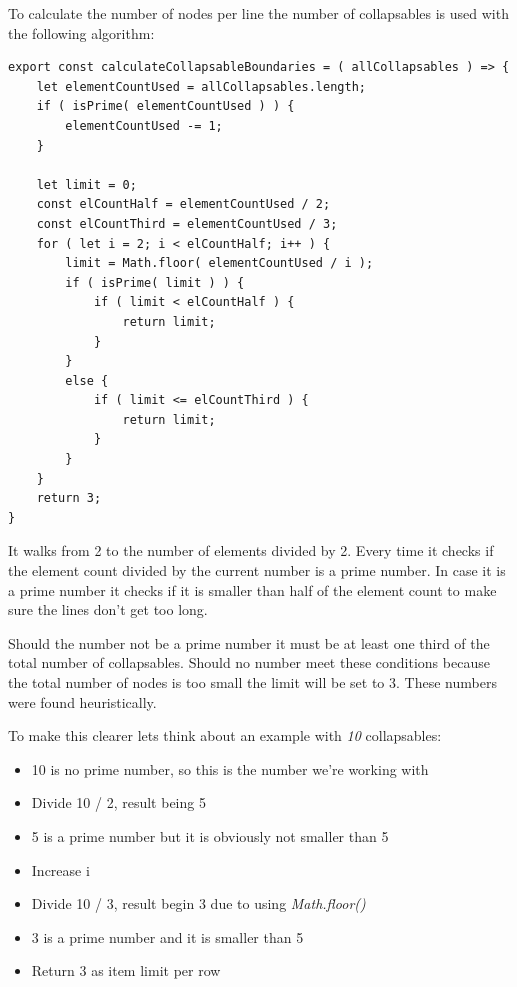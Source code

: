 To calculate the number of nodes per line the number of collapsables is used with the following algorithm:
\lstset{language=JavaScript}
\begin{lstlisting}[caption={Algorithm to determine the number of Collapsables per Row}]
export const calculateCollapsableBoundaries = ( allCollapsables ) => {
	let elementCountUsed = allCollapsables.length;
	if ( isPrime( elementCountUsed ) ) {
		elementCountUsed -= 1;
	}

	let limit = 0;
	const elCountHalf = elementCountUsed / 2;
	const elCountThird = elementCountUsed / 3;
	for ( let i = 2; i < elCountHalf; i++ ) {
		limit = Math.floor( elementCountUsed / i );
		if ( isPrime( limit ) ) {
			if ( limit < elCountHalf ) {
				return limit;
			}
		}
		else {
			if ( limit <= elCountThird ) {
				return limit;
			}
		}
	}
	return 3;
}
\end{lstlisting}

It walks from 2 to the number of elements divided by 2. Every time it checks if the element count divided by the current number is a prime number. In case it is a prime number it checks if it is smaller than half of the element count to make sure the lines don't get too long.

Should the number not be a prime number it must be at least one third of the total number of collapsables. Should no number meet these conditions because the total number of nodes is too small the limit will be set to 3. These numbers were found heuristically.

To make this clearer lets think about an example with \emph{10} collapsables:
\begin{itemize}
\item 10 is no prime number, so this is the number we're working with
\item Divide 10 / 2, result being 5
\item 5 is a prime number but it is obviously not smaller than 5
\item Increase i
\item Divide 10 / 3, result begin 3 due to using \emph{Math.floor()}
\item 3 is a prime number and it is smaller than 5
\item Return 3 as item limit per row
\end{itemize}

